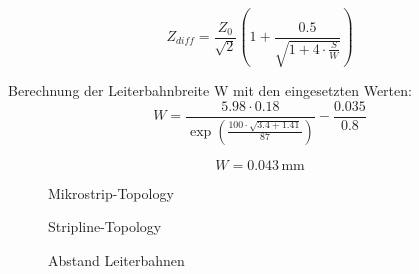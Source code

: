 \begin{equation} \label{Impedanz}
	Z_{diff} = \frac{Z_0}{\sqrt{2}} \left( 1 + \frac{0.5}{\sqrt{1 + 4\cdot \frac{S}{W}}} \right)
\end{equation}


Berechnung der Leiterbahnbreite W mit den eingesetzten Werten:
\begin{equation} \label{Leiterbahnbreite}
W = \frac{5.98 \cdot 0.18}{\exp\left(\frac{100 \cdot \sqrt{3.4 + 1.41}}{87}\right)} - \frac{0.035}{0.8}
\end{equation}

\begin{equation}
	W = 0.043 \, \text{mm}
\end{equation}


\begin{figure}[H]
	\centering    
	\caption{Mikrostrip-Topology}
	\label{MikrostripTopology}
\end{figure}

\begin{figure}[H]
    \centering    
    \caption{Stripline-Topology}
    \label{Stripline}
\end{figure}

\begin{figure}[H]
    \centering    
    \caption{Abstand Leiterbahnen}
    \label{AbstandLeiterbahnen}
\end{figure}


